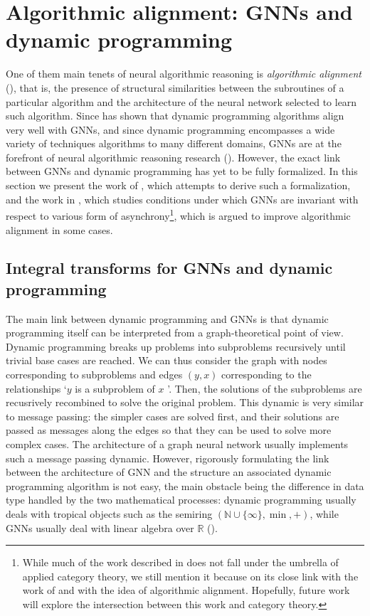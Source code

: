 \documentclass[11pt,a4paper,openright,twoside]{report}
\theoremstyle{plain}
\theoremstyle{definition}
\begin{document}
\section{Algorithmic alignment: GNNs and dynamic programming}


One of them main tenets of neural algorithmic reasoning is \textit{algorithmic alignment} (\cite{xu2019can}), that is, the presence of structural similarities between the subroutines of a particular algorithm and the architecture of the neural network selected to learn such algorithm.
Since \cite{xu2019can} has shown that dynamic programming algorithms align very well with GNNs, and since dynamic programming encompasses a wide variety of techniques algorithms to many different domains, GNNs  are at the forefront of neural algorithmic reasoning research (\cite{dudzik2022graph}). However, the exact link between GNNs and dynamic programming has yet to be fully formalized. In this section we present the work of \cite{dudzik2022graph}, which attempts to derive such a formalization, and the work in \cite{dudzik2024asynchronous}, which studies conditions under which GNNs are invariant with respect to various form of asynchrony\footnote{While much of the work described in \cite{dudzik2024asynchronous} does not fall under the umbrella of applied category theory, we still mention it because on its close link with the work of \cite{dudzik2022graph} and with the idea of algorithmic alignment. Hopefully, future work will explore the intersection between this work and category theory.}, which is argued to improve algorithmic alignment in some cases.


\subsection{Integral transforms for GNNs and dynamic programming}

The main link between dynamic programming and GNNs is that dynamic programming itself can be interpreted from a graph-theoretical point of view. Dynamic programming breaks up problems into subproblems recursively until trivial base cases are reached. We can thus consider the graph with nodes corresponding to subproblems and edges $(y,x)$ corresponding to the relationships \lq $y$ is a subproblem of $x$ \rq. Then, the solutions of the subproblems are recusrively recombined to solve the original problem. This dynamic is very similar to message passing: the simpler cases are solved first, and their solutions are passed as messages along the edges so that they can be used to solve more complex cases. The architecture of a graph neural network usually implements such a message passing dynamic. However, rigorously formulating the link between the architecture of GNN and the structure an associated dynamic programming algorithm is not easy, the main obstacle being the difference in data type handled by the two mathematical processes: dynamic programming usually deals with tropical objects such as the semiring $(\mathbb{N} \cup \{\infty\}, \min, +)$, while GNNs usually deal with linear algebra over $\mathbb{R}$ (\cite{dudzik2022graph}).
\end{document}
